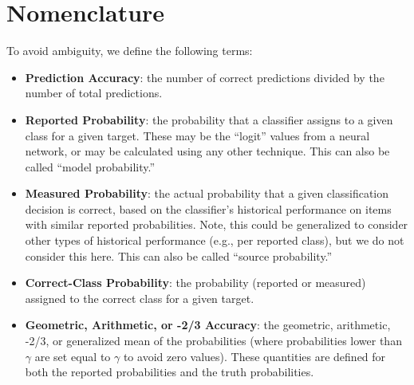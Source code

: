 \documentclass{spie}
\begin{document}
\section{Nomenclature}
\label{nomenclature}
To avoid ambiguity, we define the following terms:
\begin{itemize}
\item \textbf{Prediction Accuracy}: the number of correct predictions divided by the number of total predictions. 
\item \textbf{Reported Probability}: the probability that a classifier assigns to a given class for a given target. These may be the ``logit'' values from a neural network, or may be calculated using any other technique. This can also be called ``model probability.''
\item \textbf{Measured Probability}: the actual probability that a given classification decision is correct, based on the classifier's historical performance on items with similar reported probabilities. Note, this could be generalized to consider other types of historical performance (e.g., per reported class), but we do not consider this here. This can also be called ``source probability.'' 
\item \textbf{Correct-Class Probability}: the probability (reported or measured) assigned to the correct class for a given target.
\item \textbf{Geometric, Arithmetic, or -2/3 Accuracy}: the geometric, arithmetic, -2/3, or generalized mean of the probabilities (where probabilities lower than $\gamma$ are set equal to $\gamma$ to avoid zero values). These quantities are defined for both the reported probabilities and the truth probabilities. 
\end{itemize}
\end{document}
